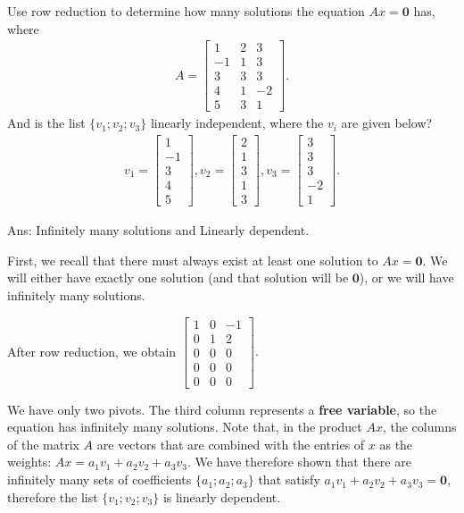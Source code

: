 \documentclass{package/notes}
\begin{document}
Use row reduction to determine how many solutions the equation $Ax=\boldsymbol{0}$ has, where
\begin{align*}
    A = \left[\begin{array}{ccc} 1 &  2 &  3 \\ -1 &  1 &  3 \\ 3 &  3 &  3 \\ 4 &  1 &  -2 \\ 5 &  3 &  1 \end{array} \right].
\end{align*}
And is the list $\{v_1;v_2;v_3\}$ linearly independent, where the $v_i$ are given below?
\begin{align*}
    v_1 = \left[\begin{array}{c} 1 \\ -1 \\ 3 \\ 4 \\ 5 \end{array} \right], v_2 = \left[\begin{array}{c} 2 \\ 1 \\ 3 \\ 1 \\ 3 \end{array} \right], v_3 = \left[\begin{array}{c} 3 \\ 3 \\ 3 \\ -2 \\ 1 \end{array} \right].
\end{align*}



Ans: Infinitely many solutions and Linearly dependent.

First, we recall that there must always exist at least one solution to $Ax=\boldsymbol{0}$. We will either have exactly one solution (and that solution will be $\boldsymbol{0}$), or we will have infinitely many solutions.

After row reduction, we obtain $\left[\begin{array}{ccc} 1 &  0 &  -1 \\ 0 &  1 &  2 \\ 0 &  0 &  0 \\ 0 &  0 &  0 \\ 0 &  0 &  0 \end{array} \right].$

We have only two pivots. The third column represents a \textbf{free variable}, so the equation has infinitely many solutions. Note that, in the product $Ax$, the columns of the matrix $A$ are vectors that are combined with the entries of $x$ as the weights: $Ax=a_1v_1+a_2v_2+a_3v_3$. We have therefore shown that there are infinitely many sets of coefficients $\{a_1;a_2;a_3\}$ that satisfy $a_1v_1+a_2v_2+a_3v_3=\boldsymbol{0}$, therefore the list $\{v_1;v_2;v_3\}$ is linearly dependent.
\end{document}
